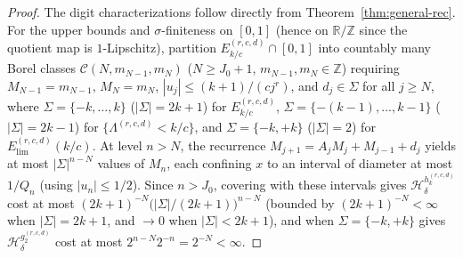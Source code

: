 \documentclass[11pt]{article}
\theoremstyle{definition}
\theoremstyle{remark}
\newcommand{\R}{\mathbb{R}}
\newcommand{\Z}{\mathbb{Z}}
\newcommand{\Lam}{\Lambda}
\begin{document}
\begin{proof}
The digit characterizations follow directly from Theorem~\ref{thm:general-rec}.
For the upper bounds and $\sigma$-finiteness on $[0,1]$ (hence on $\R/\Z$ since
the quotient map is $1$-Lipschitz), partition $E_{k/c}^{(r,c,d)}\cap[0,1]$ into
countably many Borel classes $\mathcal C(N,m_{N-1},m_N)$ ($N\ge J_0+1$,
$m_{N-1},m_N\in\Z$) requiring $M_{N-1}=m_{N-1}$, $M_N=m_N$,
$|u_j|\le(k+1)/(cj^r)$, and $d_j\in\Sigma$ for all $j\ge N$, where
$\Sigma=\{-k,\dots,k\}$ ($|\Sigma|=2k+1$) for $E_{k/c}^{(r,c,d)}$,
$\Sigma=\{-(k-1),\dots,k-1\}$ ($|\Sigma|=2k-1$) for $\{\Lam^{(r,c,d)}<k/c\}$,
and $\Sigma=\{-k,+k\}$ ($|\Sigma|=2$) for $E_{\mathrm{lim}}^{(r,c,d)}(k/c)$.
At level $n>N$, the recurrence $M_{j+1}=A_jM_j+M_{j-1}+d_j$ yields at most
$|\Sigma|^{n-N}$ values of $M_n$, each confining $x$ to an interval of diameter
at most $1/Q_n$ (using $|u_n|\le1/2$). Since $n>J_0$, covering with these
intervals gives $\mathcal H_\delta^{h_k^{(r,c,d)}}$ cost at most
$(2k+1)^{-N}\bigl(|\Sigma|/(2k+1)\bigr)^{n-N}$ (bounded by $(2k+1)^{-N}<\infty$
when $|\Sigma|=2k+1$, and $\to0$ when $|\Sigma|<2k+1$), and when $\Sigma=\{-k,+k\}$
gives $\mathcal H_\delta^{g_2^{(r,c,d)}}$ cost at most $2^{n-N}2^{-n}=2^{-N}<\infty$.


\end{proof}
\end{document}
